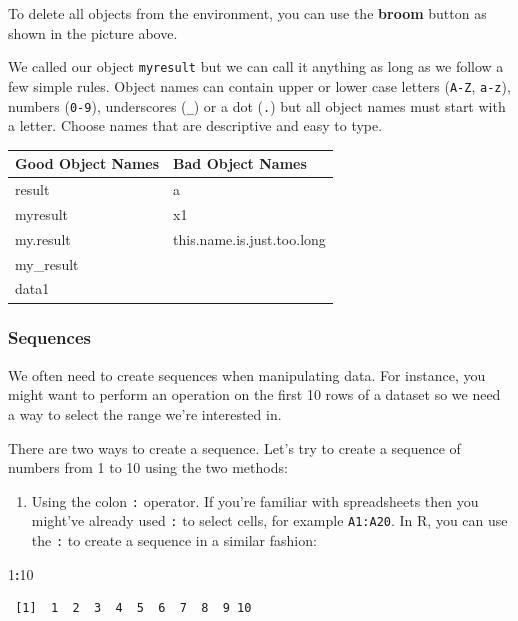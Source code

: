 \documentclass[]{article}
\newenvironment{Shaded}{\begin{snugshade}}{\end{snugshade}}
\newcommand{\DecValTok}[1]{\textcolor[rgb]{0.00,0.00,0.81}{#1}}
\newcommand{\OperatorTok}[1]{\textcolor[rgb]{0.81,0.36,0.00}{\textbf{#1}}}
\providecommand{\tightlist}{%
  \setlength{\itemsep}{0pt}\setlength{\parskip}{0pt}}
\begin{document}
To delete all objects from the environment, you can use the \textbf{broom} button as shown in the picture above.

We called our object \texttt{myresult} but we can call it anything as long as we follow a few simple rules. Object names can contain upper or lower case letters (\texttt{A-Z}, \texttt{a-z}), numbers (\texttt{0-9}), underscores (\texttt{\_}) or a dot (\texttt{.}) but all object names must start with a letter. Choose names that are descriptive and easy to type.

\begin{longtable}[]{@{}ll@{}}
\toprule
Good Object Names & Bad Object Names\tabularnewline
\midrule
\endhead
result & a\tabularnewline
myresult & x1\tabularnewline
my.result & this.name.is.just.too.long\tabularnewline
my\_result &\tabularnewline
data1 &\tabularnewline
\bottomrule
\end{longtable}

\hypertarget{sequences}{%
\subsubsection{Sequences}\label{sequences}}

We often need to create sequences when manipulating data. For instance, you might want to perform an operation on the first 10 rows of a dataset so we need a way to select the range we're interested in.

There are two ways to create a sequence. Let's try to create a sequence of numbers from 1 to 10 using the two methods:

\begin{enumerate}
\def\labelenumi{\arabic{enumi}.}
\tightlist
\item
  Using the colon \texttt{:} operator. If you're familiar with spreadsheets then you might've already used \texttt{:} to select cells, for example \texttt{A1:A20}. In R, you can use the \texttt{:} to create a sequence in a similar fashion:
\end{enumerate}

\begin{Shaded}
\begin{Highlighting}[]
\DecValTok{1}\OperatorTok{:}\DecValTok{10}
\end{Highlighting}
\end{Shaded}

\begin{verbatim}
 [1]  1  2  3  4  5  6  7  8  9 10
\end{verbatim}
\end{document}
